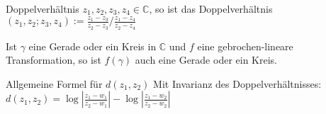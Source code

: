 \begin{defi}{Doppelverhältnis}
    $z_1,z_2,z_3,z_4 \in \mathbb{C}$, so ist das Doppelverhältnis
    $(z_1,z_2;z_3,z_4) := \frac{z_1-z_3}{z_2-z_3} / \frac{z_1-z_4}{z_2-z_4}$
\end{defi}

\begin{satz}
    Ist $\gamma$ eine Gerade oder ein Kreis in $\mathbb{C}$ und 
    $f$ eine gebrochen-lineare Transformation,
    so ist $f(\gamma)$ auch eine Gerade oder ein Kreis.
\end{satz}

\begin{bem}{Allgemeine Formel für $d(z_1,z_2)$}
    Mit Invarianz des Doppelverhältnisses:
    $d(z_1,z_2) = \log|\frac{z_1-w_1}{z_2-w_1}| - \log|\frac{z_1-w_2}{z_2-w_2}|$
\end{bem}
